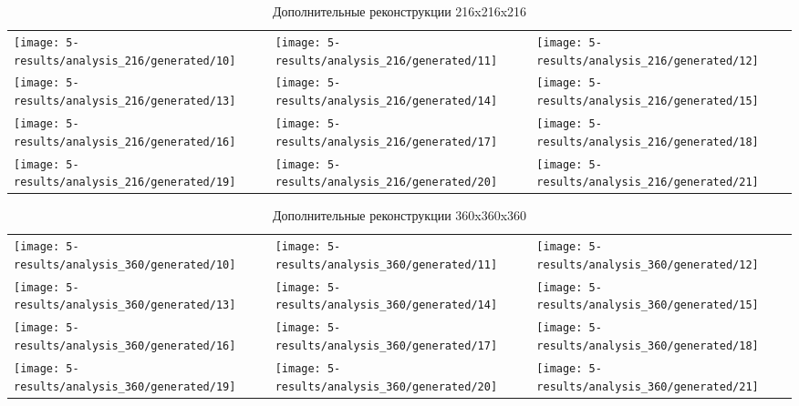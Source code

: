 		\begin{table}[h]
			\centering
			\begin{tabular}{p{5cm} p{5cm} p{5cm}}
				\toprule
				\texttt{[image: 5-results/analysis\_216/generated/10]}
				&
				\texttt{[image: 5-results/analysis\_216/generated/11]}
				&
				\texttt{[image: 5-results/analysis\_216/generated/12]}
				\\
				\texttt{[image: 5-results/analysis\_216/generated/13]}
				&
				\texttt{[image: 5-results/analysis\_216/generated/14]}
				&
				\texttt{[image: 5-results/analysis\_216/generated/15]}
				\\
				\texttt{[image: 5-results/analysis\_216/generated/16]}
				&
				\texttt{[image: 5-results/analysis\_216/generated/17]}
				&
				\texttt{[image: 5-results/analysis\_216/generated/18]}
				\\
				\texttt{[image: 5-results/analysis\_216/generated/19]}
				&
				\texttt{[image: 5-results/analysis\_216/generated/20]}
				&
				\texttt{[image: 5-results/analysis\_216/generated/21]}
				\\
				\bottomrule
			\end{tabular}
			\caption{Дополнительные реконструкции 216x216x216}
			\label{8-gen-216}
		\end{table} 
	
		\begin{table}[h]
			\centering
			\begin{tabular}{p{5cm} p{5cm} p{5cm}}
				\toprule
				\texttt{[image: 5-results/analysis\_360/generated/10]}
				&
				\texttt{[image: 5-results/analysis\_360/generated/11]}
				&
				\texttt{[image: 5-results/analysis\_360/generated/12]}
				\\
				\texttt{[image: 5-results/analysis\_360/generated/13]}
				&
				\texttt{[image: 5-results/analysis\_360/generated/14]}
				&
				\texttt{[image: 5-results/analysis\_360/generated/15]}
				\\
				\texttt{[image: 5-results/analysis\_360/generated/16]}
				&
				\texttt{[image: 5-results/analysis\_360/generated/17]}
				&
				\texttt{[image: 5-results/analysis\_360/generated/18]}
				\\
				\texttt{[image: 5-results/analysis\_360/generated/19]}
				&
				\texttt{[image: 5-results/analysis\_360/generated/20]}
				&
				\texttt{[image: 5-results/analysis\_360/generated/21]}
				\\
				\bottomrule
			\end{tabular}
			\caption{Дополнительные реконструкции 360x360x360}
			\label{8-gen-360}
		\end{table}